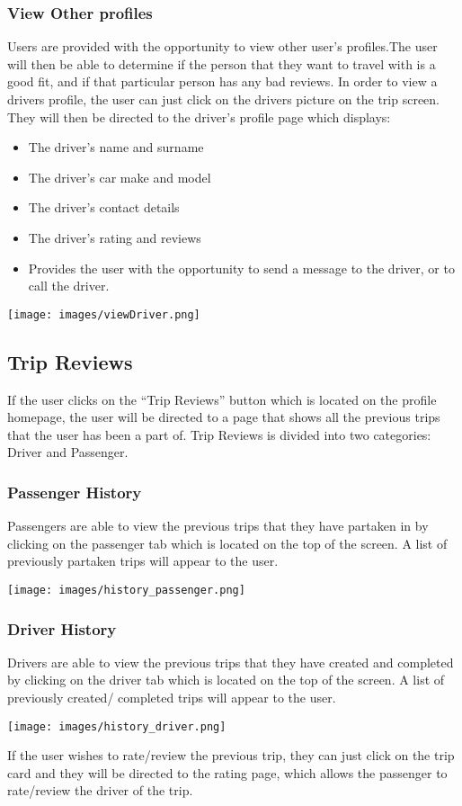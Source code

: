 \documentclass[hidelinks, 12pt, a4paper]{article}
\begin{document}
\subsubsection{View Other profiles}
Users are provided with the opportunity to view other user's profiles.The user will then be able to determine if the person that they want to travel with is a good fit, and if that particular person has any bad reviews. In order to view a drivers profile, the user can just click on the drivers picture on the trip screen. They will then be directed to the driver’s profile page which displays:
\begin{itemize}
    \item The driver’s name and surname
    \item The driver’s car make and model
    \item The driver’s contact details
    \item The driver’s rating and reviews
    \item 	Provides the user with the opportunity to send a message to the driver, or to call the driver.
\end{itemize}
\begin{center}
  \texttt{[image: images/viewDriver.png]}
\end{center}
\vspace{1cm}

\subsection{Trip Reviews}
If the user clicks on the “Trip Reviews” button which is located on the profile homepage, the user will be directed to a page that shows all the previous trips that the user has been a part of. Trip Reviews is divided into two categories: Driver and Passenger. 
\subsubsection{Passenger History}
Passengers are able to view the previous trips that they have partaken in by clicking on the passenger tab which is located on the top of the screen. A list of previously partaken trips will appear to the user.
\begin{center}
  \texttt{[image: images/history\_passenger.png]}
\end{center}
\subsubsection{Driver History}
Drivers are able to view the previous trips that they have created and completed by clicking on the driver tab which is located on the top of the screen. A list of previously created/ completed trips will appear to the user.
\begin{center}
  \texttt{[image: images/history\_driver.png]}
\end{center}
If the user wishes to rate/review the previous trip, they can just click on the trip card and they will be directed to the rating page, which allows the passenger to rate/review the driver of the trip.
\vspace{1cm}
\end{document}
